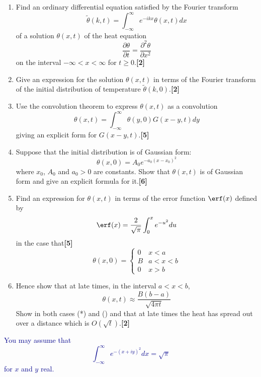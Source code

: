 \documentclass[a4paper]{article}
\begin{document}
\begin{qns}\leavevmode
\begin{enumerate}[label=(\roman*)]
    \item Find an ordinary differential equation satisfied by the Fourier transform
$$\tilde{\theta}(k,t)=\int_{-\infty}^\infty e^{-ikx}\theta(x,t)dx$$
of a solution $\theta(x,t)$ of the heat equation
$$\frac{\partial\theta}{\partial t}=\frac{\partial^2\theta}{\partial x^2}$$
on the interval $-\infty < x <\infty$ for $t\geq0$.\hfill\textbf{[2]}
\item Give an expression for the solution $\theta(x, t)$ in terms of the Fourier transform of the initial distribution of temperature $\tilde{\theta}(k,0)$.\hfill\textbf{[2]}
\item Use the convolution theorem to express $\theta(x, t)$ as a convolution
$$\theta(x,t)=\int_{-\infty}^\infty\theta(y,0)G(x-y,t)dy$$
giving an explicit form for $G(x − y, t)$.\hfill\textbf{[5]}
\item Suppose that the initial distribution is of Gaussian form:
\begin{equation}
    \theta(x,0)=A_0e^{-a_0(x-x_0)^2}\tag{*}
\end{equation}
where $x_0$, $A_0$ and $a_0 > 0$ are constants. Show that $\theta(x, t)$ is of Gaussian form and give an explicit formula for it.\hfill\textbf{[6]}
\item Find an expression for $\theta(x, t)$ in terms of the error function $\erf(x)$ defined by
$$\erf(x)=\frac{2}{\sqrt{\pi}}\int_0^xe^{-u^2}du$$
in the case that\hfill\textbf{[5]}
\begin{equation}
  \theta(x,0)=
\left\{
        \begin{array}{ll}
      0 & x<a \\
      B & a<x<b\\
      0& x>b
        \end{array}
    \right.\tag{\dag}  
\end{equation}
\item Hence show that at late times, in the interval $a<x<b$,
$$\theta(x,t)\approx\frac{B(b-a)}{\sqrt{4\pi t}}$$
Show in both cases (*) and (\dag) and that at late times the heat has spread out over a distance which is $O(\sqrt{t})$.\hfill\textbf{[2]}
\end{enumerate}
\begin{mdframed}
\textcolor{darkblue}{You may assume that
$$\int_{-\infty}^\infty e^{-(x+iy)^2}dx=\sqrt{\pi}$$
for $x$ and $y$ real.}
\end{mdframed}
\end{qns}
\end{document}
